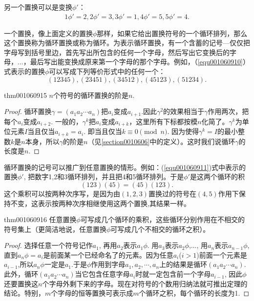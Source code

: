 另一个置换可以是变换$\phi'$：
\begin{gather}\label{equ001060911}
1\phi'=2, 2\phi'=3, 3\phi'=1, 4\phi'=5, 5\phi'=4.
\end{gather}

一个置换，像上面定义的置换$\phi$那样，如果它给出置换符号的一个循环排列，那么这个置换称为循环置换或称为循环。为表示循环置换，有一个含蓄的记号---仅仅把字母写到括号里边，首先写出所包含的任何一个字母，然后写出它变换后的字母，...，最后写出能变换成原来第一个字母的那个字母。例如，（\ref{equ001060910}）式表示的置换$\phi$可以写成下列等价形式中的任何一个：
\[
(12345),(23451),(34512),(45123),(51234).
\]

\begin{theorem}{}{thm001060915}
$n$个符号的循环置换的阶是$n$.
\end{theorem}

\begin{proof}
循环置换$\gamma = (a_1a_2\cdots a_n)$把$a_i$变成$a_{i+1}$.因此$\gamma^2$的效果相当于$\gamma$作用两次，把每个$a_i$变成$a_{i+2}$. 一般的，$\gamma^k$把$a_i$变成$a_{i+k}$，这里所有下标都按模$n$化简了。$\gamma^k$为单位元素$I$当且仅当$a_{i+k}=a_i$. 即当且仅当$k \equiv 0 \pmod{n}$. 因为使得$\gamma^k=I$的最小整数$k$是$n$本身，所以$\gamma$的阶是$n$（见\ref{section0010606}中的定义）。这时我们说循环$\gamma$的长度是$n$.
\end{proof}

循环置换的记号可以推广到任意置换的情形。例如：(\ref{equ001060911})式中表示的置换$\phi'$, 把数字1,2和3循环排列，并且把4和5循环排列。于是$\phi'$是这两个循环的积
\[
(123)(45)=(45)(123).
\]
这个乘积可以按两种次序写，是因为由$(1,2,3)$置换过的符号在$(4,5)$作用下保持不变，这表示按两种次序相继使用这两个置换,其结果一样。

\begin{theorem}{}{thm001060916}
任意置换$\phi$可写成几个循环的乘积，这些循环分别作用在不相交的符号集上（更简洁地说，任意置换$\phi$可写成几个不相交的循环之积）。
\end{theorem}

\begin{proof}
选择任意一个符号记作$a_1$, 再用$a_2$表示$a_1\phi$. 用$a_3$表示$a_2\phi$,..., 用$a_n$表示$a_{n-1}\phi$,直到$a_n\phi=a_i$是前面某一个已经命名了的元素。因为任意$a_i$($i>1$)前面一个元素是$a_{i-1}$,所以$a_n\phi$一定是$a_1$.于是$\phi$作用到字母$a_1,a_2,\cdots, a_n$上的结果是循环$(a_1a_2\cdots{}a_n)$. 此外，循环$(a_1a_2\cdots{}a_n)$当它包含任意字母$a_i$时就一定包含前一个字母$a_{i-1}$, 因此$\phi$还要置换这$n$个字母外剩下来的字母。现在对符号的个数用归纳法就可推出定理的结论。特别，$m$个字母的恒等置换可表示成$m$个循环之积，每个循环的长度为1.
\end{proof}

